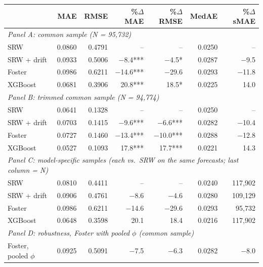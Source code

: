\begin{tabular}{lrrrrrr}
\toprule
& MAE & RMSE & \%$\Delta$MAE & \%$\Delta$RMSE & MedAE & \%$\Delta$sMAE \\
\midrule
\multicolumn{7}{l}{\emph{Panel A: common sample (N = 95,732)}} \\
SRW & 0.0860 & 0.4791 & -- & -- & 0.0250 & -- \\
SRW + drift & 0.0933 & 0.5006 & $-$8.4*** & $-$4.5* & 0.0287 & $-$9.5 \\
Foster & 0.0986 & 0.6211 & $-$14.6*** & $-$29.6 & 0.0293 & $-$11.8 \\
XGBoost & 0.0681 & 0.3906 & 20.8*** & 18.5* & 0.0225 & 14.0 \\
\midrule
\multicolumn{7}{l}{\emph{Panel B: trimmed common sample (N = 94,774)}} \\
SRW & 0.0641 & 0.1328 & -- & -- & 0.0250 & -- \\
SRW + drift & 0.0703 & 0.1415 & $-$9.6*** & $-$6.6*** & 0.0282 & $-$10.4 \\
Foster & 0.0727 & 0.1460 & $-$13.4*** & $-$10.0*** & 0.0288 & $-$12.8 \\
XGBoost & 0.0527 & 0.1093 & 17.8*** & 17.7*** & 0.0221 & 14.3 \\
\midrule
\multicolumn{7}{l}{\emph{Panel C: model-specific samples (each vs.\ SRW on the same forecasts; last column = N)}} \\
SRW & 0.0810 & 0.4411 & -- & -- & 0.0240 & 117,902 \\
SRW + drift & 0.0906 & 0.4761 & $-$8.6 & $-$4.6 & 0.0280 & 109,129 \\
Foster & 0.0986 & 0.6211 & $-$14.6 & $-$29.6 & 0.0293 & 95,732 \\
XGBoost & 0.0648 & 0.3598 & 20.1 & 18.4 & 0.0216 & 117,902 \\
\midrule
\multicolumn{7}{l}{\emph{Panel D: robustness, Foster with pooled $\phi$ (common sample)}} \\
Foster, pooled $\phi$ & 0.0925 & 0.5091 & $-$7.5 & $-$6.3 & 0.0282 & $-$8.0 \\
\bottomrule
\end{tabular}
